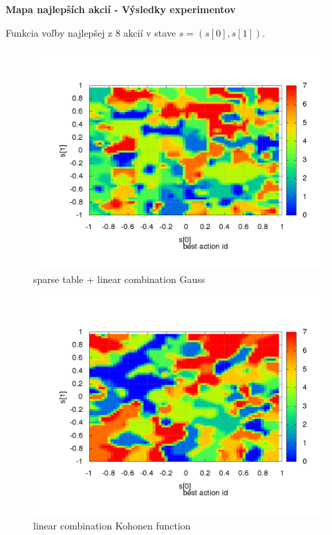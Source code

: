 \documentclass[xcolor=dvipsnames]{beamer}
\begin{document}
\begin{frame}{\bf Mapa najlepších akcií - Výsledky experimentov}

Funkcia voľby najlepšej z 8 akcií v stave  $s = (s[0], s[1])$.

\begin{minipage}{.5\textwidth}

\begin{figure}
\includegraphics[scale=.21]{../../results_q_learning/map_1/function_type_3/iterations_10/action_best_value_log_surface.png}
\caption{sparse table + linear combination Gauss}
\end{figure}


\end{minipage}%
\begin{minipage}{.5\textwidth}

\begin{figure}
\includegraphics[scale=.21]{../../results_q_learning/map_1/function_type_4/iterations_10/action_best_value_log_surface.png}
\caption{linear combination Kohonen function}
\end{figure}


\end{minipage}
\end{frame}
\end{document}
